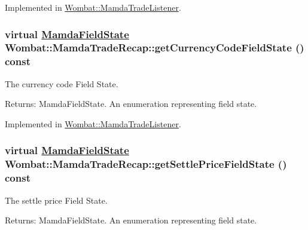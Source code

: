 Implemented in \hyperlink{classWombat_1_1MamdaTradeListener_399c33640428f8e7a5cd5e5eabc79ef8}{Wombat::Mamda\-Trade\-Listener}.\hypertarget{classWombat_1_1MamdaTradeRecap_f8812af3a07b9b5da681289918a38f73}{
\subsubsection[getCurrencyCodeFieldState]{\setlength{\rightskip}{0pt plus 5cm}virtual \hyperlink{namespaceWombat_93aac974f2ab713554fd12a1fa3b7d2a}{Mamda\-Field\-State} Wombat::Mamda\-Trade\-Recap::get\-Currency\-Code\-Field\-State () const}}
\label{classWombat_1_1MamdaTradeRecap_f8812af3a07b9b5da681289918a38f73}


The currency code Field State. 

\begin{Desc}
\item[Returns:]Mamda\-Field\-State. An enumeration representing field state. \end{Desc}


Implemented in \hyperlink{classWombat_1_1MamdaTradeListener_775a85fc8f9a1c5ecb10e7576ca0165e}{Wombat::Mamda\-Trade\-Listener}.\hypertarget{classWombat_1_1MamdaTradeRecap_a2424806f6356557b09ee35c4fc5c573}{
\subsubsection[getSettlePriceFieldState]{\setlength{\rightskip}{0pt plus 5cm}virtual \hyperlink{namespaceWombat_93aac974f2ab713554fd12a1fa3b7d2a}{Mamda\-Field\-State} Wombat::Mamda\-Trade\-Recap::get\-Settle\-Price\-Field\-State () const}}
\label{classWombat_1_1MamdaTradeRecap_a2424806f6356557b09ee35c4fc5c573}


The settle price Field State. 

\begin{Desc}
\item[Returns:]Mamda\-Field\-State. An enumeration representing field state. \end{Desc}


